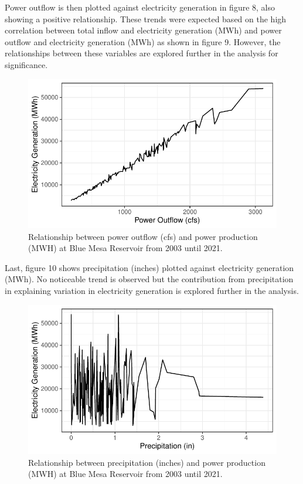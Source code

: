 \documentclass[
  12pt,
]{article}
\begin{document}
Power outflow is then plotted against electricity generation in figure
8, also showing a positive relationship. These trends were expected
based on the high correlation between total inflow and electricity
generation (MWh) and power outflow and electricity generation (MWh) as
shown in figure 9. However, the relationships between these variables
are explored further in the analysis for significance.

\begin{figure}

{\centering \includegraphics{Project_Report_files/figure-latex/MWHxPower-1} 

}

\caption{Relationship between power outflow (cfs) and power production (MWH) at Blue Mesa Reservoir from 2003 until 2021.}\label{fig:MWHxPower}
\end{figure}

Last, figure 10 shows precipitation (inches) plotted against electricity
generation (MWh). No noticeable trend is observed but the contribution
from precipitation in explaining variation in electricity generation is
explored further in the analysis.

\begin{figure}

{\centering \includegraphics{Project_Report_files/figure-latex/MWHxPrecip-1} 

}

\caption{Relationship between precipitation (inches) and power production (MWH) at Blue Mesa Reservoir from 2003 until 2021.}\label{fig:MWHxPrecip}
\end{figure}
\end{document}
